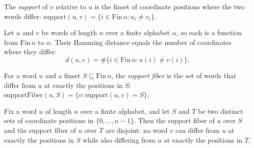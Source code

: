 \begin{definition}
\label{CommunicationComplexity.support}
\leanok
{}
The \emph{support} of $v$ relative to $u$ is the finset of coordinate positions
where the two words differ:
$\mathrm{support}(u,v) = \{i \in \mathrm{Fin}\,n : u_i \ne v_i\}$.
\end{definition}

\begin{lemma}
\label{CommunicationComplexity.support_dist}
\leanok
{}
Let $u$ and $v$ be words of length $n$ over a finite alphabet $\alpha$, so each is a
function from $\mathrm{Fin}\,n$ to $\alpha$. Their Hamming distance equals the number of
coordinates where they differ:
\[
d(u,v)=\#\{i\in\mathrm{Fin}\,n:u(i)\ne v(i)\}.
\]
\end{lemma}

\begin{definition}
\label{CommunicationComplexity.supportFiber}
\leanok
{}
For a word $u$ and a finset $S \subseteq \mathrm{Fin}\,n$, the \emph{support fiber}
is the set of words that differ from $u$ at exactly the positions in $S$:
$\mathrm{supportFiber}(u,S) = \{v : \mathrm{support}(u,v) = S\}$.
\end{definition}

\begin{lemma}
\label{CommunicationComplexity.supportFiber_disjoint}
\leanok
{}
Fix a word $u$ of length $n$ over a finite alphabet, and let $S$ and $T$ be two distinct
sets of coordinate positions in $\{0,\dots,n-1\}$. Then the support fiber of $u$ over
$S$ and the support fiber of $u$ over $T$ are disjoint: no word $v$ can differ from $u$
at exactly the positions in $S$ while also differing from $u$ at exactly the positions
in $T$.
\end{lemma}


